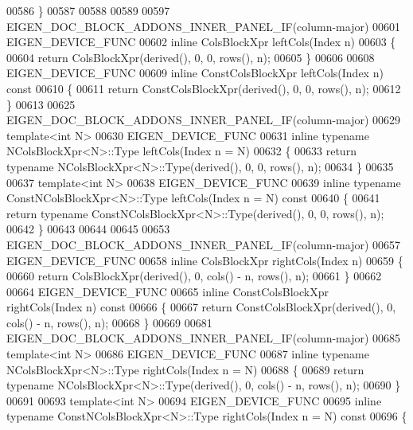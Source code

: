 \begin{DoxyCode}
00586 \}
00587 
00588 
00589 
00597 EIGEN\_DOC\_BLOCK\_ADDONS\_INNER\_PANEL\_IF(column-major)
00601 EIGEN\_DEVICE\_FUNC
00602 \textcolor{keyword}{inline} ColsBlockXpr leftCols(Index n)
00603 \{
00604   \textcolor{keywordflow}{return} ColsBlockXpr(derived(), 0, 0, rows(), n);
00605 \}
00606 
00608 EIGEN\_DEVICE\_FUNC
00609 \textcolor{keyword}{inline} ConstColsBlockXpr leftCols(Index n)\textcolor{keyword}{ const}
00610 \textcolor{keyword}{}\{
00611   \textcolor{keywordflow}{return} ConstColsBlockXpr(derived(), 0, 0, rows(), n);
00612 \}
00613 
00625 EIGEN\_DOC\_BLOCK\_ADDONS\_INNER\_PANEL\_IF(column-major)
00629 \textcolor{keyword}{template}<\textcolor{keywordtype}{int} N>
00630 EIGEN\_DEVICE\_FUNC
00631 \textcolor{keyword}{inline} \textcolor{keyword}{typename} NColsBlockXpr<N>::Type leftCols(Index n = N)
00632 \{
00633   \textcolor{keywordflow}{return} \textcolor{keyword}{typename} NColsBlockXpr<N>::Type(derived(), 0, 0, rows(), n);
00634 \}
00635 
00637 \textcolor{keyword}{template}<\textcolor{keywordtype}{int} N>
00638 EIGEN\_DEVICE\_FUNC
00639 \textcolor{keyword}{inline} \textcolor{keyword}{typename} ConstNColsBlockXpr<N>::Type leftCols(Index n = N)\textcolor{keyword}{ const}
00640 \textcolor{keyword}{}\{
00641   \textcolor{keywordflow}{return} \textcolor{keyword}{typename} ConstNColsBlockXpr<N>::Type(derived(), 0, 0, rows(), n);
00642 \}
00643 
00644 
00645 
00653 EIGEN\_DOC\_BLOCK\_ADDONS\_INNER\_PANEL\_IF(column-major)
00657 EIGEN\_DEVICE\_FUNC
00658 \textcolor{keyword}{inline} ColsBlockXpr rightCols(Index n)
00659 \{
00660   \textcolor{keywordflow}{return} ColsBlockXpr(derived(), 0, cols() - n, rows(), n);
00661 \}
00662 
00664 EIGEN\_DEVICE\_FUNC
00665 \textcolor{keyword}{inline} ConstColsBlockXpr rightCols(Index n)\textcolor{keyword}{ const}
00666 \textcolor{keyword}{}\{
00667   \textcolor{keywordflow}{return} ConstColsBlockXpr(derived(), 0, cols() - n, rows(), n);
00668 \}
00669 
00681 EIGEN\_DOC\_BLOCK\_ADDONS\_INNER\_PANEL\_IF(column-major)
00685 \textcolor{keyword}{template}<\textcolor{keywordtype}{int} N>
00686 EIGEN\_DEVICE\_FUNC
00687 \textcolor{keyword}{inline} \textcolor{keyword}{typename} NColsBlockXpr<N>::Type rightCols(Index n = N)
00688 \{
00689   \textcolor{keywordflow}{return} \textcolor{keyword}{typename} NColsBlockXpr<N>::Type(derived(), 0, cols() - n, rows(), n);
00690 \}
00691 
00693 \textcolor{keyword}{template}<\textcolor{keywordtype}{int} N>
00694 EIGEN\_DEVICE\_FUNC
00695 \textcolor{keyword}{inline} \textcolor{keyword}{typename} ConstNColsBlockXpr<N>::Type rightCols(Index n = N)\textcolor{keyword}{ const}
00696 \textcolor{keyword}{}\{

\end{DoxyCode}
